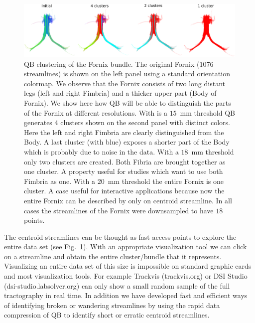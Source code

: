 \documentclass{bioinfo}
\begin{document}
\begin{methods}
\begin{figure}[htp]
\centerline{\includegraphics[width=160mm]{Figures/Fig_6_QB_fornix}}
\caption{QB clustering of the Fornix bundle. The original Fornix
  ($1076$ streamlines) is shown on the left panel using a standard
  orientation colormap. We observe that the Fornix consists of two long
  distant legs (left and right Fimbria) and a thicker upper part (Body
  of Fornix). We show here how QB will be able to distinguish the parts
  of the Fornix at different resolutions. With is a $15$~mm threshold QB
  generates 4 clusters shown on the second panel with distinct
  colors. Here the left and right Fimbria are clearly distinguished from
  the Body. A last cluster (with blue) exposes a shorter part of the
  Body which is probably due to noise in the data. With a $18$~mm
  threshold only two clusters are created. Both Fibria are brought
  together as one cluster. A property useful for studies which want to
  use both Fimbria as one. With a $20$~mm threshold the entire Fornix is
  one cluster. A case useful for interactive applications because now
  the entire Fornix can be described by only on centroid streamline. In
  all cases the streamlines of the Fornix were downsampled to have $18$
  points.\label{Flo:QB_fornix}}
\end{figure}

The centroid streamlines can be thought as fast access points to explore
the entire data set (see Fig.~\ref{Flo:QB_fornix}). With an appropriate
visualization tool we can click on a streamline and obtain the entire
cluster/bundle that it represents. Visualizing an entire data set of
this size is impossible on standard graphic cards and most visualization
tools. For example Trackvis (trackvis.org) or DSI Studio
(dsi-studio.labsolver.org) can only show a small random sample of the
full tractography in real time. In addition we have developed fast and
efficient ways of identifying broken or wandering streamlines by using
the rapid data compression of QB to identify short or erratic centroid
streamlines.



\end{methods}
\end{document}
